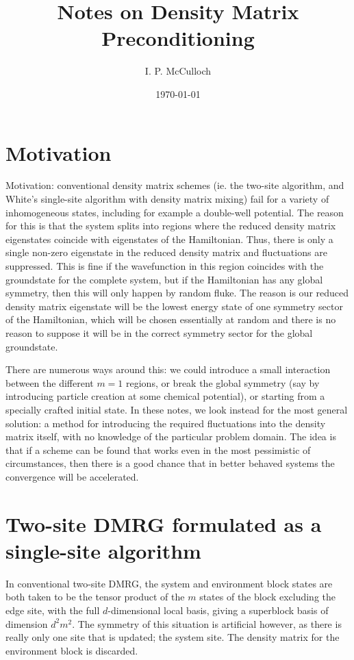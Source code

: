 \documentclass{article}[10pt]
\begin{document}
\title{Notes on Density Matrix Preconditioning}

\author{I. P. McCulloch}
\date{\today}

\maketitle

\section{Motivation}
Motivation: conventional density matrix schemes (ie. the two-site algorithm, and White's
single-site algorithm with density matrix mixing) fail for a variety of inhomogeneous
states, including for example a double-well potential.
The reason for this is that the system splits into regions where the reduced density matrix
eigenstates coincide with eigenstates of the Hamiltonian. Thus, there is only a single
non-zero eigenstate in the reduced density matrix and fluctuations are suppressed. 
This is fine if the wavefunction in this region coincides with the groundstate
for the complete system, but if the Hamiltonian has any global symmetry, then
this will only happen by random fluke. The reason is our reduced density matrix eigenstate
will be the lowest energy state of one symmetry sector of the Hamiltonian,
which will be chosen essentially at random and there is no reason to suppose it will
be in the correct symmetry sector for the global groundstate.

There are numerous ways around this: we could introduce a small interaction between the
different $m=1$ regions, or break the global symmetry (say by introducing particle creation
at some chemical potential), or starting from a specially crafted initial state.
In these notes, we look instead for the most general solution: a method for introducing
the required fluctuations into the density matrix itself, with no knowledge of the
particular problem domain. The idea is that if a scheme can be found that works even in the
most pessimistic of circumstances, then there is a good chance that in better behaved
systems the convergence will be accelerated. 

\section{Two-site DMRG formulated as a single-site algorithm}
In conventional two-site DMRG, the system and environment block states are both taken to
be the tensor product of the $m$ states of the block excluding the edge site, with the
full $d$-dimensional local basis, giving a superblock basis of dimension $d^2m^2$.
The symmetry of this situation is artificial however, as there is really only one site
that is updated; the system site. The density matrix for the environment block is discarded.
\end{document}
